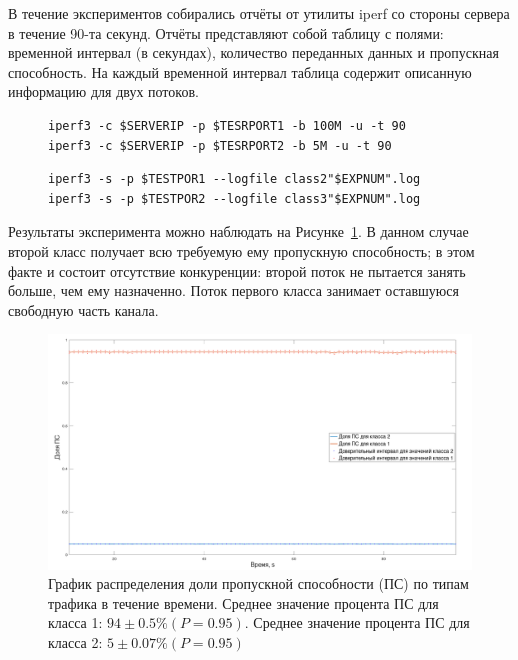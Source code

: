     		В течение экспериментов собирались отчёты от утилиты iperf со стороны сервера в
    		течение 90-та секунд. Отчёты представляют собой таблицу с полями:
			временной интервал (в секундах), количество переданных данных и пропускная способность.
			На каждый временной интервал таблица содержит описанную информацию для двух потоков.


        \begin{figure}[ht!]
    		\center
    		\begin{lstlisting}[frame=lines,
    						  caption={Команда iperf на узле-источнике (клиентская сторона).},
    						  label={lst:iperfsrc2}]
iperf3 -c $SERVERIP -p $TESRPORT1 -b 100M -u -t 90
iperf3 -c $SERVERIP -p $TESRPORT2 -b 5M -u -t 90
    		\end{lstlisting}
        \end{figure}	
        \begin{figure}[ht!]
    		\center
    		\begin{lstlisting}[frame=lines,
    						  caption={Команда iperf на узле-цели (серверная сторона).},
    						  label={lst:iperfdst2}]
iperf3 -s -p $TESTPOR1 --logfile class2"$EXPNUM".log
iperf3 -s -p $TESTPOR2 --logfile class3"$EXPNUM".log
    		\end{lstlisting}
        \end{figure}

			Результаты эксперимента можно наблюдать на Рисунке~\ref{pic:plot2}. В данном
			случае второй класс получает всю требуемую ему пропускную способность; в этом
			факте и состоит отсутствие конкуренции: второй поток не пытается занять больше,
			чем ему назначенно. Поток первого класса занимает оставшуюся свободную часть канала.
			
            \begin{figure}[ht!]
            	\center
            	\includegraphics[width=\linewidth]{./plotnc.png} %
            	\caption{График распределения доли пропускной способности (ПС) по типам трафика в течение времени.
						 Среднее значение процента  ПС для класса 1: $94 \pm 0.5 \%(P = 0.95)$.
                         Среднее значение процента  ПС для класса 2: $5 \pm 0.07 \%(P = 0.95)$}
    			\label{pic:plot2}
            \end{figure}
